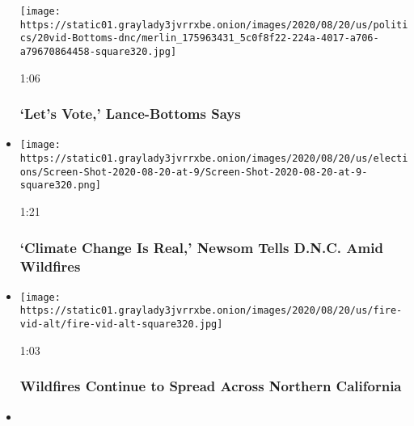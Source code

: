 \begin{itemize}
  \texttt{[image: https://static01.graylady3jvrrxbe.onion/images/2020/08/20/us/politics/20vid-Bottoms-dnc/merlin\_175963431\_5c0f8f22-224a-4017-a706-a79670864458-square320.jpg]}

  1:06

  \hypertarget{lets-vote-lance-bottoms-says}{%
  \subsubsection{`Let's Vote,' Lance-Bottoms
  Says}\label{lets-vote-lance-bottoms-says}}
\item
  \href{https://www.nytimes3xbfgragh.onion/video/us/elections/100000007299993/gavin-newsom-speaks-dnc.html?action=click\&module=video-series-bar\&region=header\&pgtype=Article\&playlistId=video/latest-video}{}

  \texttt{[image: https://static01.graylady3jvrrxbe.onion/images/2020/08/20/us/elections/Screen-Shot-2020-08-20-at-9/Screen-Shot-2020-08-20-at-9-square320.png]}

  1:21

  \hypertarget{climate-change-is-real-newsom-tells-dnc-amid-wildfires}{%
  \subsubsection{`Climate Change Is Real,' Newsom Tells D.N.C. Amid
  Wildfires}\label{climate-change-is-real-newsom-tells-dnc-amid-wildfires}}
\item
  \href{https://www.nytimes3xbfgragh.onion/video/us/politics/100000007298876/northern-california-wildfires-video.html?action=click\&module=video-series-bar\&region=header\&pgtype=Article\&playlistId=video/latest-video}{}

  \texttt{[image: https://static01.graylady3jvrrxbe.onion/images/2020/08/20/us/fire-vid-alt/fire-vid-alt-square320.jpg]}

  1:03

  \hypertarget{wildfires-continue-to-spread-across-northern-california}{%
  \subsubsection{Wildfires Continue to Spread Across Northern
  California}\label{wildfires-continue-to-spread-across-northern-california}}
\item
  \href{https://www.nytimes3xbfgragh.onion/video/us/politics/100000007297733/democratic-national-convention-highlights.html?action=click\&module=video-series-bar\&region=header\&pgtype=Article\&playlistId=video/latest-video}{}


\end{itemize}
